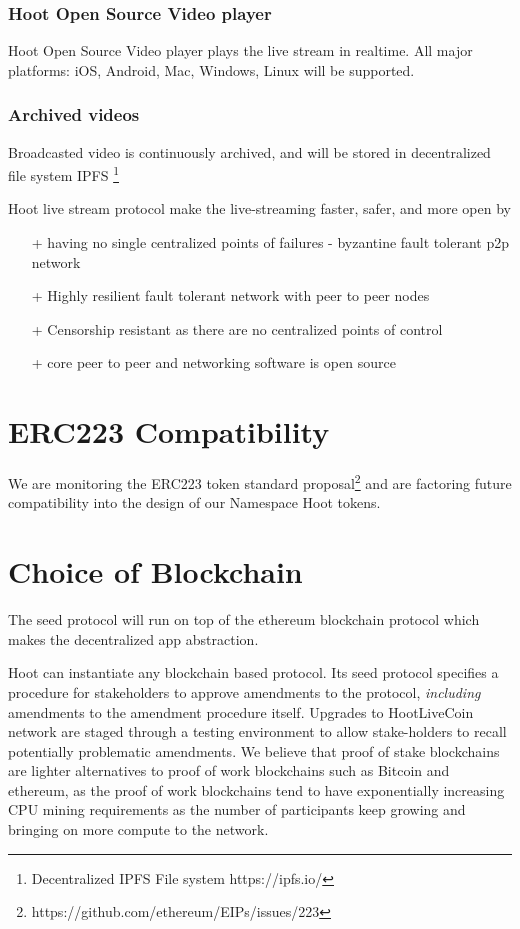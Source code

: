 \documentclass{article}
\begin{document}
\subsubsection{Hoot Open Source Video player}
Hoot Open Source Video player plays the live stream in realtime. All major platforms: iOS, Android, Mac, Windows, Linux will be supported.

\subsubsection{Archived videos}
Broadcasted video is continuously archived, and will be stored in decentralized file system IPFS \footnote{Decentralized IPFS File system https://ipfs.io/}

Hoot live stream protocol make the live-streaming faster, safer, and more open by

\begin{itemize}
 \item[+]having no single centralized points of failures - byzantine fault tolerant p2p network
 \item[+]Highly resilient fault tolerant network with peer to peer nodes
 \item[+]Censorship resistant as there are no centralized points of control
 \item[+]core peer to peer and networking software is open source
\end{itemize}

\section{ERC223 Compatibility}
We are monitoring the ERC223 token standard proposal\footnote{https://github.com/ethereum/EIPs/issues/223} and are factoring future compatibility into the design of our Namespace Hoot tokens.

\section{Choice of Blockchain}
The seed protocol will run on top of the ethereum blockchain protocol which makes the decentralized app abstraction. 

Hoot can instantiate any blockchain based protocol. Its seed protocol specifies a procedure for stakeholders to approve amendments to the protocol, \emph{including} amendments to the amendment procedure itself. Upgrades to HootLiveCoin network are staged through a testing environment to allow stake-holders to recall potentially problematic amendments. We believe that proof of stake blockchains are lighter alternatives to proof of work blockchains such as Bitcoin and ethereum, as the proof of work blockchains tend to have exponentially increasing CPU mining requirements as the number of participants keep growing and bringing on more compute to the network.
\end{document}
